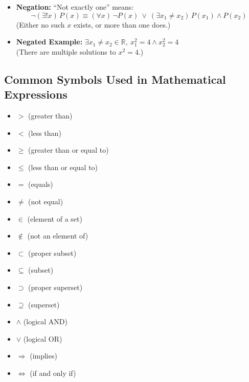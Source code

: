 \begin{description}[leftmargin=1.5cm, labelindent=1cm, style=sameline]
\begin{itemize}
    \item \textbf{Negation:} \quad ``Not exactly one'' means:
    \[
    \neg (\exists! x)\, P(x) \equiv (\forall x)\, \neg P(x)\ \lor\ (\exists x_1 \neq x_2)\, P(x_1) \land P(x_2)
    \]
    (Either no such \( x \) exists, or more than one does.)

    \item \textbf{Negated Example:} \quad $\exists x_1 \neq x_2 \in \mathbb{R},\ x_1^2 = 4 \land x_2^2 = 4$ \\
    (There are multiple solutions to \( x^2 = 4 \).)
\end{itemize}

\end{description}

\subsection{Common Symbols Used in Mathematical Expressions}

\begin{itemize}
    \item $>$ \quad (greater than) \\
    \item $<$ \quad (less than) \\
    \item $\geq$ \quad (greater than or equal to) \\
    \item $\leq$ \quad (less than or equal to) \\
    \item $=$ \quad (equals) \\
    \item $\neq$ \quad (not equal) \\
    \item $\in$ \quad (element of a set) \\
    \item $\notin$ \quad (not an element of) \\
    \item $\subset$ \quad (proper subset) \\
    \item $\subseteq$ \quad (subset) \\
    \item $\supset$ \quad (proper superset) \\
    \item $\supseteq$ \quad (superset) \\
    \item $\land$ \quad (logical AND) \\
    \item $\lor$ \quad (logical OR) \\
    \item $\Rightarrow$ \quad (implies) \\
    \item $\Leftrightarrow$ \quad (if and only if)
\end{itemize}

\newpage